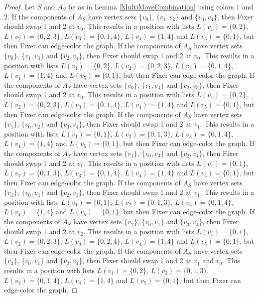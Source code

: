 \documentclass[12pt]{amsart}
\theoremstyle{plain}
\theoremstyle{definition}
\theoremstyle{remark}
\begin{document}
\begin{proof}
Let $S$ and $A_S$ be as in Lemma \ref{MultiMoveCombination} using colors $1$ and $2$. If the components of $A_S$ have vertex sets $\{v_0\}$, $\{v_1, v_2\}$ and $\{v_3, v_4\}$, then Fixer should swap 1 and 2 at $v_0$. This results in a position with lists $L(v_1) = \{0, 2\}$, $L(v_2) = \{0, 2, 3\}$, $L(v_3) = \{0, 1, 4\}$, $L(v_4) = \{1, 4\}$ and $L(v_5) = \{0, 1\}$, but then Fixer can edge-color the graph.
If the components of $A_S$ have vertex sets $\{v_0\}$, $\{v_1, v_3\}$ and $\{v_2, v_4\}$, then Fixer should swap 1 and 2 at $v_0$. This results in a position with lists $L(v_1) = \{0, 2\}$, $L(v_2) = \{0, 2, 3\}$, $L(v_3) = \{0, 1, 4\}$, $L(v_4) = \{1, 4\}$ and $L(v_5) = \{0, 1\}$, but then Fixer can edge-color the graph.
If the components of $A_S$ have vertex sets $\{v_0\}$, $\{v_1, v_4\}$ and $\{v_2, v_3\}$, then Fixer should swap 1 and 2 at $v_0$. This results in a position with lists $L(v_1) = \{0, 2\}$, $L(v_2) = \{0, 2, 3\}$, $L(v_3) = \{0, 1, 4\}$, $L(v_4) = \{1, 4\}$ and $L(v_5) = \{0, 1\}$, but then Fixer can edge-color the graph.
If the components of $A_S$ have vertex sets $\{v_1\}$, $\{v_0, v_2\}$ and $\{v_3, v_4\}$, then Fixer should swap 1 and 2 at $v_1$. This results in a position with lists $L(v_1) = \{0, 1\}$, $L(v_2) = \{0, 1, 3\}$, $L(v_3) = \{0, 1, 4\}$, $L(v_4) = \{1, 4\}$ and $L(v_5) = \{0, 1\}$, but then Fixer can edge-color the graph.
If the components of $A_S$ have vertex sets $\{v_1\}$, $\{v_0, v_3\}$ and $\{v_2, v_4\}$, then Fixer should swap 1 and 2 at $v_1$. This results in a position with lists $L(v_1) = \{0, 1\}$, $L(v_2) = \{0, 1, 3\}$, $L(v_3) = \{0, 1, 4\}$, $L(v_4) = \{1, 4\}$ and $L(v_5) = \{0, 1\}$, but then Fixer can edge-color the graph.
If the components of $A_S$ have vertex sets $\{v_1\}$, $\{v_0, v_4\}$ and $\{v_2, v_3\}$, then Fixer should swap 1 and 2 at $v_1$. This results in a position with lists $L(v_1) = \{0, 1\}$, $L(v_2) = \{0, 1, 3\}$, $L(v_3) = \{0, 1, 4\}$, $L(v_4) = \{1, 4\}$ and $L(v_5) = \{0, 1\}$, but then Fixer can edge-color the graph.
If the components of $A_S$ have vertex sets $\{v_2\}$, $\{v_0, v_1\}$ and $\{v_3, v_4\}$, then Fixer should swap 1 and 2 at $v_2$. This results in a position with lists $L(v_1) = \{0, 1\}$, $L(v_2) = \{0, 2, 3\}$, $L(v_3) = \{0, 2, 4\}$, $L(v_4) = \{1, 4\}$ and $L(v_5) = \{0, 1\}$, but then Fixer can edge-color the graph.
If the components of $A_S$ have vertex sets $\{v_3\}$, $\{v_0, v_1\}$ and $\{v_2, v_4\}$, then Fixer should swap 1 and 2 at $v_1$ and $v_0$. This results in a position with lists $L(v_1) = \{0, 2\}$, $L(v_2) = \{0, 1, 3\}$, $L(v_3) = \{0, 1, 4\}$, $L(v_4) = \{1, 4\}$ and $L(v_5) = \{0, 1\}$, but then Fixer can edge-color the graph.

\end{proof}
\end{document}
